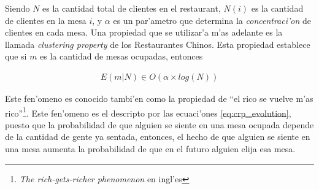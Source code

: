 Siendo $N$ es la cantidad total de clientes en el restaurant, $N(i)$ es la cantidad de clientes en la mesa $i$, y $\alpha$ es un 
par'ametro que determina la \emph{concentraci'on} de clientes en cada mesa. Una propiedad que se utilizar'a m'as adelante es la llamada \emph{clustering property} de los Restaurantes Chinos.
Esta propiedad establece que si $m$ es la cantidad de mesas ocupadas, entonces

\begin{align}
\label{eq:crp_clustering}
E(m|N) \in O(\alpha\times log(N))
\end{align}

Este fen'omeno es conocido tambi'en como la propiedad de ``el rico se vuelve m'as rico''\footnote{\emph{The rich-gets-richer phenomenon} en ingl'es}. Este fen'omeno es el descripto por
las ecuaci'ones \ref{eq:crp_evolution}, puesto que la probabilidad de que alguien se siente en una mesa ocupada depende de la cantidad de gente ya sentada, entonces, el hecho
de que alguien se siente en una mesa aumenta la probabilidad de que en el futuro alguien elija esa mesa.
